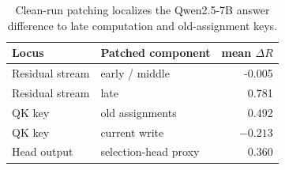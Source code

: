 \begin{table}[tbp]
\centering
\small
\setlength{\tabcolsep}{7pt}
\caption{Clean-run patching localizes the Qwen2.5-7B answer difference to late
computation and old-assignment keys.}
\label{tab:patch-attribution}
\begin{tabular}{llr}
\toprule
Locus & Patched component & mean $\Delta R$ \\
\midrule
Residual stream & early / middle & -0.005 \\
Residual stream & late & \cellcolor{blue!55} 0.781 \\
QK key & old assignments & \cellcolor{blue!35} 0.492 \\
QK key & current write & \cellcolor{red!16} $-0.213$ \\
Head output & selection-head proxy & \cellcolor{blue!25} 0.360 \\
\bottomrule
\end{tabular}
\end{table}

